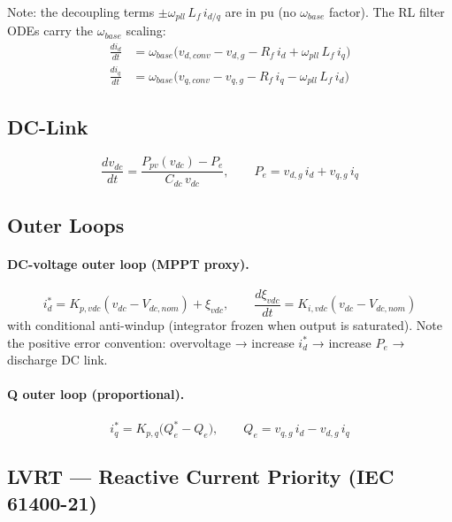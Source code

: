 \documentclass[11pt,a4paper]{article}
\begin{document}
Note: the decoupling terms $\pm\omega_{pll}\,L_f\,i_{d/q}$ are in pu
(no $\omega_{base}$ factor).  The RL filter ODEs carry the $\omega_{base}$
scaling:
\begin{align}
  \frac{di_d}{dt} &= \omega_{base}\bigl(
    v_{d,conv} - v_{d,g} - R_f\,i_d + \omega_{pll}\,L_f\,i_q\bigr)
  \label{eq:did}\\
  \frac{di_q}{dt} &= \omega_{base}\bigl(
    v_{q,conv} - v_{q,g} - R_f\,i_q - \omega_{pll}\,L_f\,i_d\bigr)
  \label{eq:diq}
\end{align}

\subsection{DC-Link}
\begin{equation}
  \frac{dv_{dc}}{dt} = \frac{P_{pv}(v_{dc}) - P_e}{C_{dc}\,v_{dc}},
  \qquad P_e = v_{d,g}\,i_d + v_{q,g}\,i_q
  \label{eq:vdc}
\end{equation}

\subsection{Outer Loops}

\paragraph{DC-voltage outer loop (MPPT proxy).}
\begin{equation}
  i_d^\ast = K_{p,vdc}(v_{dc} - V_{dc,nom}) + \xi_{vdc},
  \qquad
  \frac{d\xi_{vdc}}{dt} = K_{i,vdc}(v_{dc} - V_{dc,nom})
  \label{eq:vdc_outer}
\end{equation}
with conditional anti-windup (integrator frozen when output is saturated).
Note the positive error convention: overvoltage → increase $i_d^\ast$ →
increase $P_e$ → discharge DC link.

\paragraph{Q outer loop (proportional).}
\begin{equation}
  i_q^\ast = K_{p,q}\bigl(Q_e^\ast - Q_e\bigr),
  \qquad Q_e = v_{q,g}\,i_d - v_{d,g}\,i_q
  \label{eq:q_outer}
\end{equation}

\subsection{LVRT — Reactive Current Priority (IEC 61400-21)}
\end{document}
